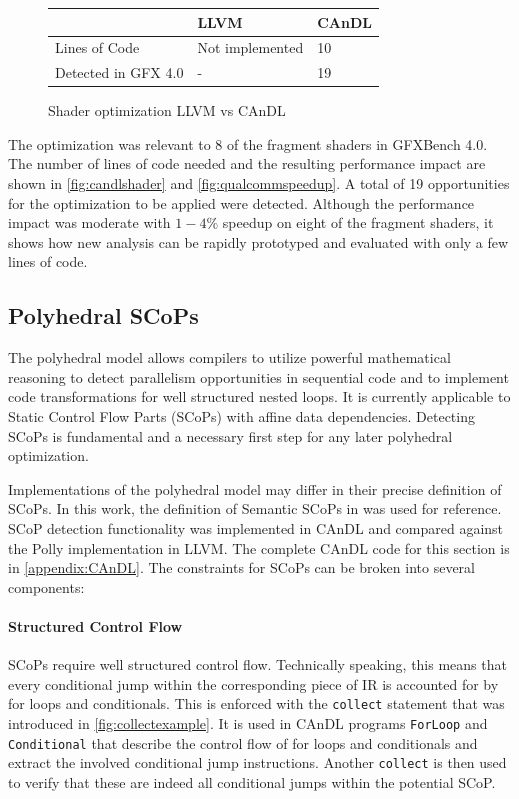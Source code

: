 \begin{figure}[b]
\centering
\begin{tabular}{|l||l|l|}
\hline
         & LLVM  &CAnDL \\
\hline
\hline
Lines of Code & Not implemented& 10 \\ \hline
Detected in GFX 4.0 & - & 19 \\ \hline
\hline
\end{tabular}
\caption{Shader optimization LLVM vs CAnDL}
\label{fig:candlshader}
\end{figure}

    The optimization was relevant to 8 of the fragment shaders in GFXBench 4.0.
    The number of lines of code needed and the resulting performance impact are
    shown in \autoref{fig:candlshader} and \autoref{fig:qualcommspeedup}.
    A total of 19 opportunities for the optimization to be applied were
    detected.
    Although the performance impact was moderate with $1-4\%$ speedup on eight
    of the fragment shaders, it shows how new analysis can be rapidly prototyped
    and evaluated with only a few lines of code.

\subsection{Polyhedral SCoPs}

    The polyhedral model allows compilers to utilize powerful mathematical
    reasoning to detect parallelism opportunities in sequential code and to
    implement code transformations for well structured nested
    loops.
    It is currently applicable to Static Control Flow Parts (SCoPs) with affine
    data dependencies.
    Detecting SCoPs is fundamental and a necessary first step for any later
    polyhedral optimization.

    Implementations of the polyhedral model may differ in their precise
    definition of SCoPs.
    In this work, the definition of Semantic SCoPs in \citet{Lengauer2012Polly}
    was used for reference.
    SCoP detection functionality was implemented in CAnDL and compared against
    the Polly implementation in LLVM.
    The complete CAnDL code for this section is in \autoref{appendix:CAnDL}.
    The constraints for SCoPs can be broken into several components:

    \paragraph*{Structured Control Flow}
    SCoPs require well structured control flow.
    Technically speaking, this means that every conditional jump within the
    corresponding piece of IR is accounted for by for loops and conditionals.
    This is enforced with the \texttt{collect} statement that was introduced in
    \autoref{fig:collectexample}.
    It is used in CAnDL programs \texttt{ForLoop} and
    \texttt{Conditional} that describe the control flow of for loops and
    conditionals and extract the involved conditional jump instructions.
    Another \texttt{collect} is then used to verify that these are indeed all
    conditional jumps within the potential SCoP.

